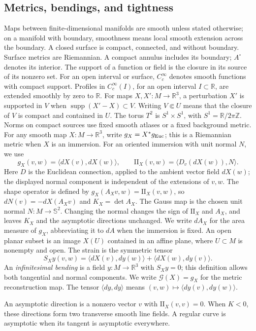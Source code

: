 \documentclass[11pt]{amsart}
\theoremstyle{definition}
\theoremstyle{remark}
\newcommand{\R}{\mathbb R}\newcommand{\Sph}{\mathbb S}
\DeclareMathOperator{\supp}{supp}
\newcommand{\II}{\mathrm{II}}\newcommand{\Gmap}{\mathcal G}
\numberwithin{equation}{section}
\begin{document}
\subsection{Metrics, bendings, and tightness}
Maps between finite-dimensional manifolds are smooth unless stated
otherwise; on a manifold with boundary, smoothness means local smooth
extension across the boundary. A closed surface is compact, connected,
and without boundary. Surface metrics are Riemannian. A compact annulus
includes its boundary; $A^\circ$ denotes
its interior. The support of a function or field is the closure in its
source of its nonzero set. For an open interval or surface,
$C_c^\infty$ denotes smooth functions with compact support.
Profiles in $C_c^\infty(I)$, for an open interval $I\subset\R$, are
extended smoothly by zero to $\R$.
For maps $X,X':M\to\R^3$, a perturbation $X'$ is supported in $V$
when $\supp(X'-X)\subset V$.
Writing $V\Subset U$ means that the closure of $V$ is compact and
contained in $U$. The torus $T^2$ is $S^1\times S^1$, with
$S^1=\R/2\pi\mathbb Z$.
Norms on compact sources use fixed smooth atlases or a fixed background
metric. For any smooth map $X:M\to\R^3$, write $g_X=X^*g_{\rm Euc}$;
this is a Riemannian metric when $X$ is an immersion. For an oriented
immersion with unit normal $N$, we use
\[
 g_X(v,w)=\langle dX(v),dX(w)\rangle,\qquad
 \II_X(v,w)=\langle D_v(dX(w)),N\rangle.
\]
Here $D$ is the Euclidean connection, applied to the ambient vector
field $dX(w)$; the displayed normal component is independent of the
extensions of $v,w$. The shape operator is defined by
$g_X(A_Xv,w)=\II_X(v,w)$, so $dN(v)=-dX(A_Xv)$ and $K_X=\det A_X$.
The Gauss map is the chosen unit normal $N:M\to\Sph^2$.
Changing the normal changes the sign of $\II_X$ and $A_X$, and leaves
$K_X$ and the asymptotic directions unchanged. We write $dA_X$ for the
area measure of $g_X$, abbreviating it to $dA$ when the immersion is fixed.
An open planar subset is an image $X(U)$ contained in an affine plane,
where $U\subset M$ is nonempty and open. The strain is the symmetric tensor
\[
 S_Xy(v,w)=\langle dX(v),dy(w)\rangle+
             \langle dX(w),dy(v)\rangle.
\]
An \emph{infinitesimal bending} is a field $y:M\to\R^3$ with $S_Xy=0$;
this definition allows both tangential and normal components. We write
$\Gmap(X)=g_X$ for the metric reconstruction map. The tensor
$\langle dy,dy\rangle$ means $(v,w)\mapsto\langle dy(v),dy(w)\rangle$.

An asymptotic direction is a nonzero vector $v$ with $\II_X(v,v)=0$.
When $K<0$, these directions form two transverse smooth line fields.
A regular curve is asymptotic when its tangent is asymptotic everywhere.
\end{document}
